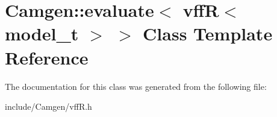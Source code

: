 \hypertarget{a00207}{}\section{Camgen\+:\+:evaluate$<$ vff\+R$<$ model\+\_\+t $>$ $>$ Class Template Reference}
\label{a00207}


The documentation for this class was generated from the following file\+:\begin{DoxyCompactItemize}
\item 
include/\+Camgen/vff\+R.\+h\end{DoxyCompactItemize}
